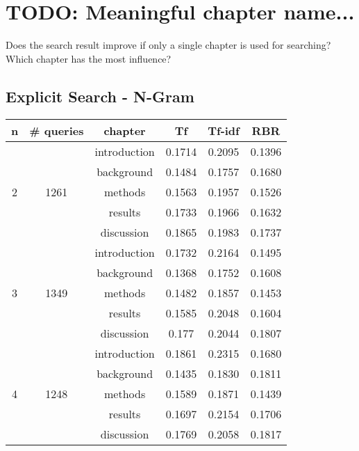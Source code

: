 \section{TODO: Meaningful chapter name...}
Does the search result improve if only a single chapter is used for searching? \\
Which chapter has the most influence?

\subsection{Explicit Search - N-Gram}
\begin{center}
  \begin{tabular}{ | c | c | c | c | c | c |}
    \hline
    \rowcolor{lightblue}
    \textbf{n} & \textbf{\# queries} & \textbf{chapter} & \textbf{Tf} & \textbf{Tf-idf} & \textbf{RBR} \\ \hline
    \multirow{5}{*}{2} & \multirow{5}{*}{1261} & introduction & 0.1714 & 0.2095 & 0.1396 \\ \cline{3-6}
                                              && background   & 0.1484 & 0.1757 & 0.1680 \\ \cline{3-6}
                                              && methods      & 0.1563 & 0.1957 & 0.1526 \\ \cline{3-6}
                                              && results      & 0.1733 & 0.1966 & 0.1632 \\ \cline{3-6}
                                              && discussion   & 0.1865 & 0.1983 & 0.1737 \\ \hline \hline
    \multirow{5}{*}{3} & \multirow{5}{*}{1349} & introduction & 0.1732 & 0.2164 & 0.1495 \\ \cline{3-6}
                                              && background   & 0.1368 & 0.1752 & 0.1608 \\ \cline{3-6}
                                              && methods      & 0.1482 & 0.1857 & 0.1453 \\ \cline{3-6}
                                              && results      & 0.1585 & 0.2048 & 0.1604 \\ \cline{3-6}
                                              && discussion   & 0.177  & 0.2044 & 0.1807 \\ \hline \hline
    \multirow{5}{*}{4} & \multirow{5}{*}{1248} & introduction & 0.1861 & 0.2315 & 0.1680 \\ \cline{3-6}
                                              && background   & 0.1435 & 0.1830 & 0.1811 \\ \cline{3-6}
                                              && methods      & 0.1589 & 0.1871 & 0.1439 \\ \cline{3-6}
                                              && results      & 0.1697 & 0.2154 & 0.1706 \\ \cline{3-6}
                                              && discussion   & 0.1769 & 0.2058 & 0.1817 \\ \hline
  \end{tabular}
\end{center}


